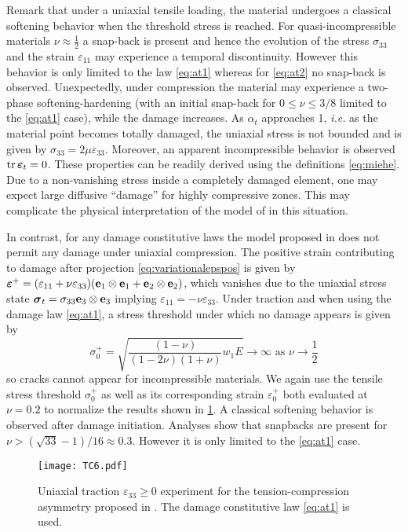 Remark that under a uniaxial tensile loading, the material undergoes a classical softening behavior when the threshold stress is reached. For quasi-incompressible materials $\nu\approx\frac{1}{2}$ a snap-back is present and hence the evolution of the stress $\sigma_{33}$ and the strain $\varepsilon_{11}$ may experience a temporal discontinuity. However this behavior is only limited to the law \eqref{eq:at1} whereas for \eqref{eq:at2} no snap-back is observed. Unexpectedly, under compression the material may experience a two-phase softening-hardening (with an initial snap-back for $0\leq \nu\leq 3/8$ limited to the \eqref{eq:at1} case), while the damage increases. As $\alpha_t$ approaches 1, \emph{i.e.} as the material point becomes totally damaged, the uniaxial stress is not bounded and is given by $\sigma_{33}=2\mu\varepsilon_{33}$. Moreover, an apparent incompressible behavior is observed $\tr\eps_t=0$. These properties can be readily derived using the definitions \eqref{eq:miehe}. Due to a non-vanishing stress inside a completely damaged element, one may expect large diffusive ``damage'' for highly compressive zones. This may complicate the physical interpretation of the model of \cite{MieheHofackerWelschinger:2010} in this situation.

In contrast, for any damage constitutive laws the model proposed in \cite{FreddiRoyer-Carfagni:2010} does not permit any damage under uniaxial compression. The positive strain contributing to damage after projection \eqref{eq:variationalepspos} is given by $\eps^+=(\varepsilon_{11}+\nu\varepsilon_{33})(\vec{e}_1\otimes\vec{e}_1+\vec{e}_2\otimes\vec{e}_2)$, which vanishes due to the uniaxial stress state $\sig_t=\sigma_{33}\vec{e}_3\otimes\vec{e}_3$ implying $\varepsilon_{11}=-\nu\varepsilon_{33}$. Under traction and when using the damage law \eqref{eq:at1}, a stress threshold under which no damage appears is given by
\[
\sigma_0^+=\sqrt{\frac{(1-\nu)}{(1-2\nu)(1+\nu)}w_1E}\to\infty\text{ as $\nu\to\frac{1}{2}$}
\]
so cracks cannot appear for incompressible materials. We again use the tensile stress threshold $\sigma_0^+$ as well as its corresponding strain $\varepsilon_0^+$ both evaluated at $\nu=0.2$ to normalize the results shown in \cref{fig:freddi}. A classical softening behavior is observed after damage initiation. Analyses show that snapbacks are present for $\nu>(\sqrt{33}-1)/16\approx 0.3$. However it is only limited to the \eqref{eq:at1} case.
\begin{figure}[htbp]
\centering
\texttt{[image: TC6.pdf]}
\caption{Uniaxial traction $\varepsilon_{33}\geq 0$ experiment for the tension-compression asymmetry proposed in \cite{FreddiRoyer-Carfagni:2010}. The damage constitutive law \eqref{eq:at1} is used.} \label{fig:freddi}
\end{figure}


